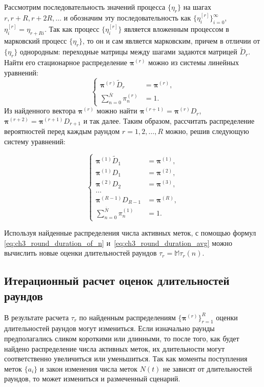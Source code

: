 Рассмотрим последовательность значений процесса $\{ \eta_r \}$ на шагах $r, r+R, r+2R, \dots$ и обозначим эту последовательность как $\{ \eta_i^{[r]} \}_{i=0}^\infty$, $\eta_i^{[r]} = \eta_{r+Ri}$. Так как процесс $\{ \eta_{i}^{[r]} \}$ является вложенным процессом в марковский процесс $\{ \eta_r \}$, то он и сам является марковским, причем в отличии от $\{ \eta_r \}$ однородным: переходные матрицы между шагами задаются матрицей $\widetilde{D}_r$. Найти его стационарное распределение $\bm{\pi}^{(r)}$ можно из системы линейных уравнений:
$$
	\begin{cases}
		\bm{\pi}^{(r)} \widetilde{D}_r &= \bm{\pi}^{(r)},\\
		\sum\limits_{n=0}^{\overline{N}} \pi^{(r)}_n &= 1.
	\end{cases}
$$
Из найденного вектора $\bm{\pi}^{(r)}$ можно найти $\bm{\pi}^{(r+1)} = \bm{\pi}^{(r)} D_r$, $\bm{\pi}^{(r+2)} = \bm{\pi}^{(r+1)} D_{r+1}$ и так далее. Таким образом, рассчитать распределение вероятностей перед каждым раундом $r = 1, 2, \dots, R$ можно, решив следующую систему уравнений:

\begin{equation}\label{eq:ch3_bg_pmf_system}
	\begin{cases}
		\bm{\pi}^{(1)} \widetilde{D}_1 &= \bm{\pi}^{(1)},\\
		\bm{\pi}^{(1)} D_1 &= \bm{\pi}^{(2)},\\
		\bm{\pi}^{(2)} D_2 &= \bm{\pi}^{(3)},\\
		\dots&\\
		\bm{\pi}^{(R-1)} D_{R-1} &= \bm{\pi}^{(R)},\\
		\sum\limits_{n=0}^{\overline{N}} \pi^{(1)}_n &= 1.
	\end{cases}
\end{equation}

Используя найденные распределения числа активных меток, с помощью формул \eqref{eq:ch3_round_duration_of_n} и~\eqref{eq:ch3_round_duration_avg} можно вычислить новые оценки длительностей раундов $\tau_r = \mathbb{M} \tau_r(n)$.



\subsection{Итерационный расчет оценок длительностей раундов}\label{subsec:ch3_iterative_algorithm}
В результате расчета $\tau_r$ по найденным распределениям $\{ \bm{\pi}^{(r)} \}_{r=1}^R$ оценки длительностей раундов могут измениться. Если изначально раунды предполагались сликом короткими или длинными, то после того, как будет найдено распределение числа активных меток, их длительности могут соответственно увеличиться или уменьшиться. Так как моменты поступления меток $\{a_i\}$ и закон изменения числа меток $N(t)$ не зависят от длительностей раундов, то может измениться и размеченный сценарий.

